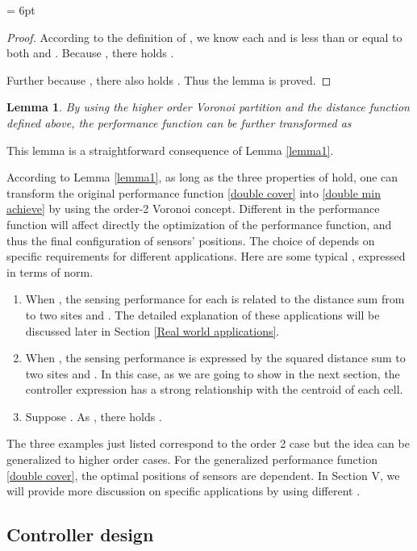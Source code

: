\documentclass[letterpaper, 10 pt, conference]{ieeeconf}
\newtheorem{lemma}{Lemma}
\begin{document}
\parskip= 6pt
\begin{proof}
According to the definition of , we know each  and  is less than or equal to both  and . Because , there holds .

Further because , there also holds . Thus the lemma is proved.
\end{proof}

\begin{lemma} By using the higher order Voronoi partition and the distance function defined above, the performance function can be further transformed as

\end{lemma}
This lemma is a straightforward consequence of Lemma \ref{lemma1}.

According to Lemma \ref{lemma1}, as long as the three properties of  hold, one can transform the original performance function \eqref{double cover} into \eqref{double min achieve} by using the order-2 Voronoi concept.
Different  in the performance function will affect directly the optimization of the performance function, and thus the final configuration of sensors' positions.
The choice of  depends on specific requirements for different applications. Here are some typical , expressed in terms of norm.
\begin{enumerate}
  \item When , the sensing performance for each  is related to the distance sum from  to two sites  and .  The detailed explanation of these applications will be discussed later in Section \ref{Real world applications}.
  \item When , the sensing performance is expressed by the squared distance sum to two sites  and .  In this case, as we are going to show in the next section, the controller expression has a strong relationship with the centroid of each cell.
  \item Suppose . As , there holds .
\end{enumerate}
The three examples just listed correspond to the order 2 case but the idea can be generalized to higher order cases.
For the generalized performance function \eqref{double cover}, the optimal positions of sensors are  dependent. In Section V, we will provide more discussion on specific applications by using different  .

\subsection{Controller design}
\end{document}
